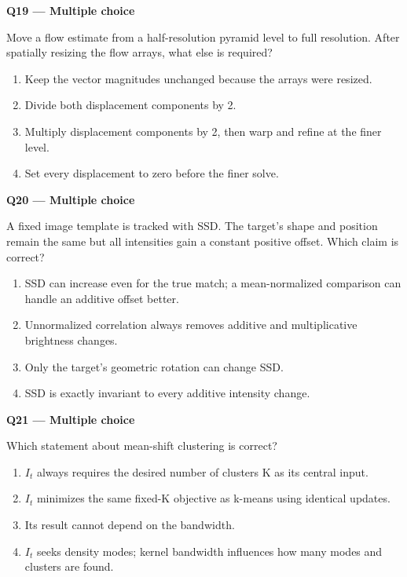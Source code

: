 \documentclass[11pt,a4paper]{article}
\begin{document}
\par\vspace{12pt}
\begin{minipage}{\linewidth}
\textbf{Q19 — Multiple choice}\par\smallskip
Move a flow estimate from a half-resolution pyramid level to full resolution. After spatially resizing the flow arrays,\allowbreak{} what else is required?
\begin{enumerate}[label=\textbf{\Alph*.}]
\item Keep the vector magnitudes unchanged because the arrays were resized.
\item Divide both displacement components by 2.
\item Multiply displacement components by 2,\allowbreak{} then warp and refine at the finer level.
\item Set every displacement to zero before the finer solve.
\end{enumerate}
\end{minipage}
\par\vspace{12pt}
\begin{minipage}{\linewidth}
\textbf{Q20 — Multiple choice}\par\smallskip
A fixed image template is tracked with SSD. The target's shape and position remain the same but all intensities gain a constant positive offset. Which claim is correct?
\begin{enumerate}[label=\textbf{\Alph*.}]
\item SSD can increase even for the true match; a mean-normalized comparison can handle an additive offset better.
\item Unnormalized correlation always removes additive and multiplicative brightness changes.
\item Only the target's geometric rotation can change SSD.
\item SSD is exactly invariant to every additive intensity change.
\end{enumerate}
\end{minipage}
\par\vspace{12pt}
\begin{minipage}{\linewidth}
\textbf{Q21 — Multiple choice}\par\smallskip
Which statement about mean-shift clustering is correct?
\begin{enumerate}[label=\textbf{\Alph*.}]
\item \(I_t\) always requires the desired number of clusters K as its central input.
\item \(I_t\) minimizes the same fixed-K objective as k-means using identical updates.
\item Its result cannot depend on the bandwidth.
\item \(I_t\) seeks density modes; kernel bandwidth influences how many modes and clusters are found.
\end{enumerate}
\end{minipage}
\end{document}
